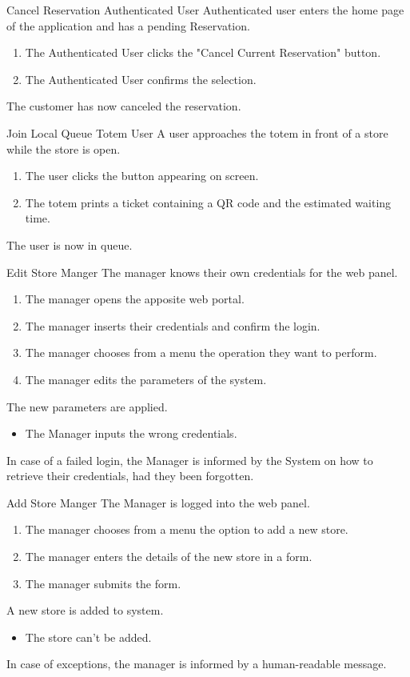 \usecase
{Cancel Reservation}
{Authenticated User}
{Authenticated user enters the home page of the application and has a pending Reservation.}
{
    \begin{enumerate}
        \item The Authenticated User clicks the "Cancel Current Reservation" button.
        \item The Authenticated User confirms the selection.
    \end{enumerate}
}
{
    The customer has now canceled the reservation.
}
{}
{}

\usecase
{Join Local Queue}
{Totem User}
{A user approaches the totem in front of a store while the store is open.}
{
    \begin{enumerate}
        \item The user clicks the button appearing on screen.
        \item The totem prints a ticket containing a QR code and the estimated waiting time.
    \end{enumerate}
}
{
    The user is now in queue.
}
{}
{}

\usecase
{Edit Store}
{Manger}
{The manager knows their own credentials for the web panel.}
{
    \begin{enumerate}
        \item The manager opens the apposite web portal.
        \item The manager inserts their credentials and confirm the login.
        \item The manager chooses from a menu the operation they want to perform.
        \item The manager edits the parameters of the system.
    \end{enumerate}
}
{
    The new parameters are applied.
}
{
    \begin{itemize}
        \item The Manager inputs the wrong credentials.
    \end{itemize}
}
{
    In case of a failed login, the Manager is informed by the System on how to retrieve their credentials, had they been forgotten.
}

\usecase
{Add Store}
{Manger}
{The Manager is logged into the web panel.}
{
    \begin{enumerate}
        \item The manager chooses from a menu the option to add a new store.
        \item The manager enters the details of the new store in a form.
        \item The manager submits the form.
    \end{enumerate}
}
{
    A new store is added to system.
}
{
    \begin{itemize}
        \item The store can't be added.
    \end{itemize}
}
{
    In case of exceptions, the manager is informed by a human-readable message.
}



